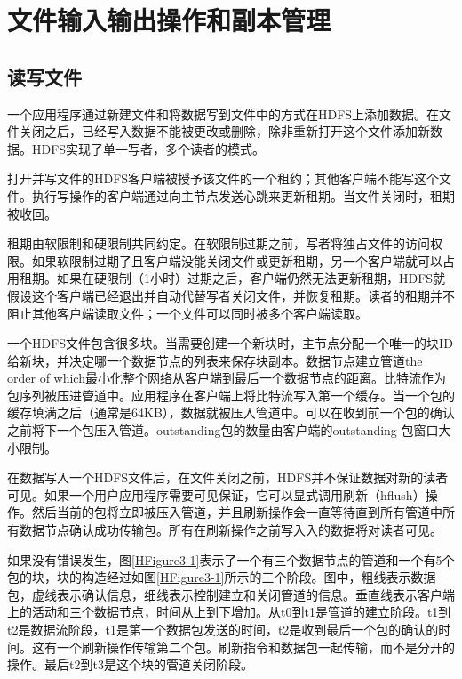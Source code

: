 \section{文件输入输出操作和副本管理}

\subsection{读写文件}

一个应用程序通过新建文件和将数据写到文件中的方式在HDFS上添加数据。在文件关闭之后，已经写入数据不能被更改或删除，除非重新打开这个文件添加新数据。HDFS实现了单一写者，多个读者的模式。

打开并写文件的HDFS客户端被授予该文件的一个租约；其他客户端不能写这个文件。执行写操作的客户端通过向主节点发送心跳来更新租期。当文件关闭时，租期被收回。

租期由软限制和硬限制共同约定。在软限制过期之前，写者将独占文件的访问权限。如果软限制过期了且客户端没能关闭文件或更新租期，另一个客户端就可以占用租期。如果在硬限制（1小时）过期之后，客户端仍然无法更新租期，HDFS就假设这个客户端已经退出并自动代替写者关闭文件，并恢复租期。读者的租期并不阻止其他客户端读取文件；一个文件可以同时被多个客户端读取。

一个HDFS文件包含很多块。当需要创建一个新块时，主节点分配一个唯一的块ID给新块，并决定哪一个数据节点的列表来保存块副本。数据节点建立管道the order of which最小化整个网络从客户端到最后一个数据节点的距离。比特流作为包序列被压进管道中。应用程序在客户端上将比特流写入第一个缓存。当一个包的缓存填满之后（通常是64KB），数据就被压入管道中。可以在收到前一个包的确认之前将下一个包压入管道。outstanding包的数量由客户端的outstanding 包窗口大小限制。

在数据写入一个HDFS文件后，在文件关闭之前，HDFS并不保证数据对新的读者可见。如果一个用户应用程序需要可见保证，它可以显式调用刷新（hflush）操作。然后当前的包将立即被压入管道，并且刷新操作会一直等待直到所有管道中所有数据节点确认成功传输包。所有在刷新操作之前写入入的数据将对读者可见。


如果没有错误发生，图\ref{HFigure3-1}表示了一个有三个数据节点的管道和一个有5个包的块，块的构造经过如图\ref{HFigure3-1}所示的三个阶段。图中，粗线表示数据包，虚线表示确认信息，细线表示控制建立和关闭管道的信息。垂直线表示客户端上的活动和三个数据节点，时间从上到下增加。从t0到t1是管道的建立阶段。t1到t2是数据流阶段，t1是第一个数据包发送的时间，t2是收到最后一个包的确认的时间。这有一个刷新操作传输第二个包。刷新指令和数据包一起传输，而不是分开的操作。最后t2到t3是这个块的管道关闭阶段。

